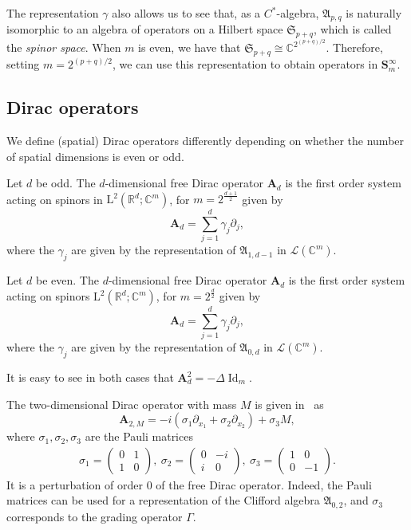 \documentclass[AHL,Unicode,longabstracts,published]{cedram}
\DeclareMathOperator{\Id}{Id}
\newcommand{\RL}{\mathrm{L}}
\newcommand{\R}{\mathbb R}
\newcommand{\C}{\mathbb C}
\newcommand{\CL}{\mathcal{L}}
\newcommand{\BA}{\mathbf A}
\newcommand{\BS}{\mathbf S}
\newcommand{\FA}{\mathfrak A}
\newcommand{\FS}{\mathfrak S}
\newcommand{\del}{\partial}
\begin{document}
The representation $\gamma$ also allows us to see that, as a $C^*$-algebra, $\FA_{p,q}$ is naturally isomorphic to an algebra of operators on a Hilbert space $\FS_{p+q}$, which is called the \emph{spinor space}. When $m$ is even, we have that $\FS_{p+q} \cong \C^{2^{(p+q)/2}}$. Therefore, setting $m = 2^{(p+q)/2}$, we can use this representation to obtain operators in $\BS^\infty_m$.


\subsection{Dirac operators}

We define (spatial) Dirac operators differently depending on whether the number of spatial dimensions is even or odd.
\begin{defi}
Let $d$ be odd. The $d$-dimensional free Dirac operator $\BA_d$ is the first order system acting on spinors in $\RL^2(\R^d;\C^m)$, for $m = 2^{\frac{d+1}{2}}$ given by
\begin{equation}
\BA_d = \sum_{j=1}^d \gamma_j \del_j,
\end{equation}
where the $\gamma_j$ are given by the representation of $\FA_{1,d-1}$ in $\CL(\C^{m})$.
\end{defi}
\begin{defi}
Let $d$ be even. The $d$-dimensional free Dirac operator $\BA_d$ is the first order system acting on spinors $\RL^2(\R^d;\C^m)$, for $m = 2^{\frac d 2}$ given by
\begin{equation}
\BA_d = \sum_{j=1}^d \gamma_j \del_j,
\end{equation}
where the $\gamma_j$ are given by the representation of $\FA_{0,d}$ in $\CL(\C^{m})$.
\end{defi}

It is easy to see in both cases that $\BA_d^2 = - \Delta \Id_{m}$.
\begin{exem}
The two-dimensional Dirac operator with mass $M$ is given in~\cite[Equation 1.14]{thaller} as
\begin{equation}
\BA_{2,M} = -i\left(\sigma_1 \del_{x_1} + \sigma_2 \del_{x_2} \right) + \sigma_3 M,
\end{equation}
where $\sigma_1, \sigma_2,
\sigma_3$ are the Pauli matrices
\begin{align}
\sigma_1=
\begin{pmatrix}
0 & 1\\
1 & 0
\end{pmatrix},\
\sigma_2=
\begin{pmatrix}
0 & -i\\
i & 0
\end{pmatrix},\
\sigma_3=
\begin{pmatrix}
1 & 0\\
0 & -1
\end{pmatrix}.
\end{align}
It is a perturbation of order $0$ of the free Dirac operator. Indeed, the Pauli matrices can be used for a representation of the Clifford algebra $\FA_{0,2}$, and $\sigma_3$ corresponds to the grading operator $\Gamma$.
\end{exem}
\end{document}
